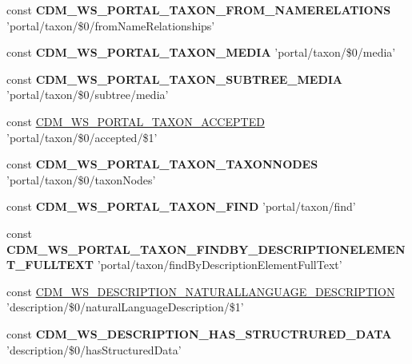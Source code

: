 \begin{DoxyCompactItemize}
\item 
\hypertarget{webservice__uris_8php_a9678fad4668d8da2de4ad09da640220b}{const {\bfseries C\-D\-M\-\_\-\-W\-S\-\_\-\-P\-O\-R\-T\-A\-L\-\_\-\-T\-A\-X\-O\-N\-\_\-\-F\-R\-O\-M\-\_\-\-N\-A\-M\-E\-R\-E\-L\-A\-T\-I\-O\-N\-S} 'portal/taxon/\$0/from\-Name\-Relationships'}\label{webservice__uris_8php_a9678fad4668d8da2de4ad09da640220b}

\item 
\hypertarget{webservice__uris_8php_a62188253a051437b04e5f213aa4b6cf9}{const {\bfseries C\-D\-M\-\_\-\-W\-S\-\_\-\-P\-O\-R\-T\-A\-L\-\_\-\-T\-A\-X\-O\-N\-\_\-\-M\-E\-D\-I\-A} 'portal/taxon/\$0/media'}\label{webservice__uris_8php_a62188253a051437b04e5f213aa4b6cf9}

\item 
\hypertarget{webservice__uris_8php_a42aafd4ec67203eae6ee3fa5cfffbe62}{const {\bfseries C\-D\-M\-\_\-\-W\-S\-\_\-\-P\-O\-R\-T\-A\-L\-\_\-\-T\-A\-X\-O\-N\-\_\-\-S\-U\-B\-T\-R\-E\-E\-\_\-\-M\-E\-D\-I\-A} 'portal/taxon/\$0/subtree/media'}\label{webservice__uris_8php_a42aafd4ec67203eae6ee3fa5cfffbe62}

\item 
const \hyperlink{webservice__uris_8php_a645d28dccd34bd6e56fee95dced308b1}{C\-D\-M\-\_\-\-W\-S\-\_\-\-P\-O\-R\-T\-A\-L\-\_\-\-T\-A\-X\-O\-N\-\_\-\-A\-C\-C\-E\-P\-T\-E\-D} 'portal/taxon/\$0/accepted/\$1'
\item 
\hypertarget{webservice__uris_8php_a39431ebf55a3b348ac15a267ead13765}{const {\bfseries C\-D\-M\-\_\-\-W\-S\-\_\-\-P\-O\-R\-T\-A\-L\-\_\-\-T\-A\-X\-O\-N\-\_\-\-T\-A\-X\-O\-N\-N\-O\-D\-E\-S} 'portal/taxon/\$0/taxon\-Nodes'}\label{webservice__uris_8php_a39431ebf55a3b348ac15a267ead13765}

\item 
\hypertarget{webservice__uris_8php_a7b228121e4f146c178400ee4dbc01b3a}{const {\bfseries C\-D\-M\-\_\-\-W\-S\-\_\-\-P\-O\-R\-T\-A\-L\-\_\-\-T\-A\-X\-O\-N\-\_\-\-F\-I\-N\-D} 'portal/taxon/find'}\label{webservice__uris_8php_a7b228121e4f146c178400ee4dbc01b3a}

\item 
\hypertarget{webservice__uris_8php_a918679eb81b997c1f4705a39b97736fa}{const {\bfseries C\-D\-M\-\_\-\-W\-S\-\_\-\-P\-O\-R\-T\-A\-L\-\_\-\-T\-A\-X\-O\-N\-\_\-\-F\-I\-N\-D\-B\-Y\-\_\-\-D\-E\-S\-C\-R\-I\-P\-T\-I\-O\-N\-E\-L\-E\-M\-E\-N\-T\-\_\-\-F\-U\-L\-L\-T\-E\-X\-T} 'portal/taxon/find\-By\-Description\-Element\-Full\-Text'}\label{webservice__uris_8php_a918679eb81b997c1f4705a39b97736fa}

\item 
const \hyperlink{webservice__uris_8php_a34c662d1aac8801a249db7fa8d8e4fca}{C\-D\-M\-\_\-\-W\-S\-\_\-\-D\-E\-S\-C\-R\-I\-P\-T\-I\-O\-N\-\_\-\-N\-A\-T\-U\-R\-A\-L\-L\-A\-N\-G\-U\-A\-G\-E\-\_\-\-D\-E\-S\-C\-R\-I\-P\-T\-I\-O\-N} 'description/\$0/natural\-Language\-Description/\$1'
\item 
\hypertarget{webservice__uris_8php_aba55f21ddc741516179da63cedd1f242}{const {\bfseries C\-D\-M\-\_\-\-W\-S\-\_\-\-D\-E\-S\-C\-R\-I\-P\-T\-I\-O\-N\-\_\-\-H\-A\-S\-\_\-\-S\-T\-R\-U\-C\-T\-R\-U\-R\-E\-D\-\_\-\-D\-A\-T\-A} 'description/\$0/has\-Structured\-Data'}\label{webservice__uris_8php_aba55f21ddc741516179da63cedd1f242}


\end{DoxyCompactItemize}
